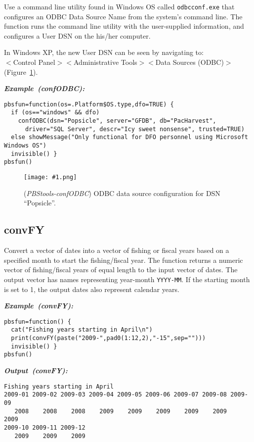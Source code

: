 \documentclass[letterpaper,12pt,fleqn]{article}
\def\tab{\hspace{0.5 in}}
\newcommand{\code}[1]{\small\texttt{#1}\normalsize}
\newcommand{\dQuote}[1]{``#1''}
\newcommand{\gui}[1]{\small\textmd{\textsf{#1}}\normalsize}
\newcommand\pbsfig[4]{    %
	\begin{figure}[ht!] %
	\centering
	\texttt{[image: \#1.png]}
	\ifthenelse{\isempty{#4}}
		{\caption[#2]{(\emph{#1}) #2}\vspace{-2ex}}
		{\caption[#4]{(\emph{#1}) #2}\vspace{-2ex}}
	\label{fig:#1}
	\end{figure}
}
\newcommand\pbstest[4]{    %
	\begin{figure}[ht!] %
	\centering
	\texttt{[image: \#1.png]}
	\ifthenelse{\isempty{#4}}  %
	{\caption[#2]{(\emph{#1}) #2}\vspace{-2ex}}
	{\caption[#4]{(\emph{#1}) #2}\vspace{-2ex}}
	\label{fig:#1}
	\end{figure}
}
\newcommand\example[1]{    %
	\textbf{\emph{Example~(#1):}}\\ \vspace{3 pt}
}
\newcommand\results[1]{    %
	\textbf{\emph{Output~(#1):}}\\ \vspace{3 pt}
}
\begin{document}
\tab Use a command line utility found in Windows OS called \code{odbcconf.exe} that configures an ODBC Data Source Name from the system's command line. The function runs the command line utility with the user-supplied information, and configures a User DSN on the his/her computer.

In Windows XP, the new User DSN can be seen by navigating to:\\
\gui{$<$Control Panel$><$Administrative Tools$><$Data Sources (ODBC)$>$} (Figure~\ref{fig:PBStools-confODBC}).

\begin{examplebox}
\example{confODBC}
\begin{Verbatim}[fontsize=\footnotesize]
pbsfun=function(os=.Platform$OS.type,dfo=TRUE) {
  if (os=="windows" && dfo)
    confODBC(dsn="Popsicle", server="GFDB", db="PacHarvest",
      driver="SQL Server", descr="Icy sweet nonsense", trusted=TRUE) 
  else showMessage("Only functional for DFO personnel using Microsoft Windows OS")
  invisible() }
pbsfun()
\end{Verbatim}
\end{examplebox}
\pbsfig{PBStools-confODBC}{ODBC data source configuration for DSN \dQuote{Popsicle}.}{3.25}{}

\subsection {convFY}

\tab Convert a vector of dates into a vector of fishing or fiscal years based on a specified month to start the fishing/fiscal year.  The function returns a numeric vector of fishing/fiscal years of equal length to the input vector of dates. The output vector has names representing year-month \code{YYYY-MM}.  If the starting month is set to 1, the output dates also represent calendar years.

\begin{examplebox}
\example{convFY}
\begin{Verbatim}[fontsize=\footnotesize]
pbsfun=function() {
  cat("Fishing years starting in April\n")
  print(convFY(paste("2009-",pad0(1:12,2),"-15",sep="")))
  invisible() }
pbsfun()
\end{Verbatim}
\end{examplebox}

\begin{outputbox}
\results{convFY}
\begin{Verbatim}[fontsize=\footnotesize]
Fishing years starting in April
2009-01 2009-02 2009-03 2009-04 2009-05 2009-06 2009-07 2009-08 2009-09 
   2008    2008    2008    2009    2009    2009    2009    2009    2009 
2009-10 2009-11 2009-12 
   2009    2009    2009
\end{Verbatim}
\end{outputbox}
\end{document}
